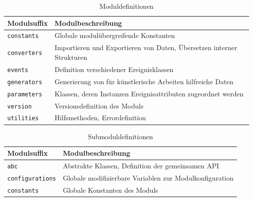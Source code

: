 \documentclass[12pt,a4paper,ngerman]{article}
\begin{document}
\begin{table}[h!]
    \begin{center}
        \begin{tabular}{l l} 
            \hline
            Modulsuffix & Modulbeschreibung \\ [0.5ex] 
            \hline\hline
            \texttt{constants} & Globale modulübergreifende Konstanten \\
            \texttt{converters} & Importieren und Exportieren von Daten, Übersetzen interner Strukturen \\
            \texttt{events} & Definition verschiedener Ereignisklassen \\
            \texttt{generators} & Generierung von für künstlerische Arbeiten hilfreiche Daten \\
            \texttt{parameters} & Klassen, deren Instanzen Ereignisattributen zugeordnet werden \\
            \texttt{version} & Versionsdefinition des Moduls \\
            \texttt{utilities} & Hilfsmethoden, Errordefinition \\ [1ex] 
            \hline
        \end{tabular}
    \end{center}

    \caption{Moduldefinitionen}
\end{table}

\begin{table}[h!]
    \begin{center}
        \begin{tabular}{l l} 
            \hline
            Modulsuffix & Modulbeschreibung \\ [0.5ex] 
            \hline\hline
            \texttt{abc} & Abstrakte Klassen, Definition der gemeinsamen API \\
            \texttt{configurations} & Globale modifizierbare Variablen zur Modulkonfiguration \\
            \texttt{constants} & Globale Konstanten des Moduls \\
            \hline
        \end{tabular}
    \end{center}

    \caption{Submoduldefinitionen}

\end{table}
\end{document}
